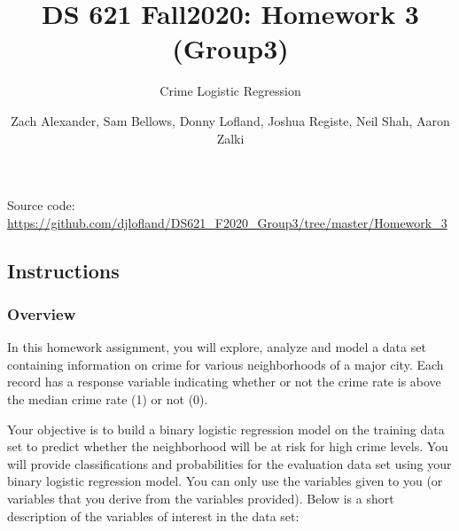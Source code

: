 \documentclass[
]{article}
\title{DS 621 Fall2020: Homework 3 (Group3)}
\subtitle{Crime Logistic Regression}
\author{Zach Alexander, Sam Bellows, Donny Lofland, Joshua Registe, Neil Shah,
Aaron Zalki}
\date{}
\begin{document}
\maketitle

Source code:
\url{https://github.com/djlofland/DS621_F2020_Group3/tree/master/Homework_3}

\hypertarget{instructions}{%
\subsection{Instructions}\label{instructions}}

\hypertarget{overview}{%
\subsubsection{Overview}\label{overview}}

In this homework assignment, you will explore, analyze and model a data
set containing information on crime for various neighborhoods of a major
city. Each record has a response variable indicating whether or not the
crime rate is above the median crime rate (1) or not (0).

Your objective is to build a binary logistic regression model on the
training data set to predict whether the neighborhood will be at risk
for high crime levels. You will provide classifications and
probabilities for the evaluation data set using your binary logistic
regression model. You can only use the variables given to you (or
variables that you derive from the variables provided). Below is a short
description of the variables of interest in the data set:
\end{document}
